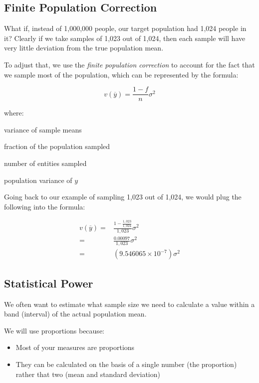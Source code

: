 \documentclass[11pt]{lecturenotes}
\begin{document}









\subsection{Finite Population Correction}
What if, instead of 1,000,000 people, our target population had 1,024 people in it? Clearly if we take samples of 1,023 out of 1,024, then each sample will have very little deviation from the true population mean. 

To adjust that, we use the \emph{finite population correction} to account for the fact that we sample most of the population, which can be represented by the formula:

\[ v(\overline{y})=\frac{1-f}{n}\sigma^2 \]

where:
\begin{description}\itemsep0pt
\item[$v(\overline{y})$] variance of sample means
\item[$f$] fraction of the population sampled
\item[$n$] number of entities sampled
\item[$\sigma^2$] population variance of $y$
\end{description}

Going back to our example of sampling 1,023 out of 1,024, we would plug the following into the formula:
\vspace{-1em}

\begin{align*}
v(\overline{y}) = & \frac{1-\frac{1,023}{1,024}}{1,023}\sigma^2 \\
= & \frac{0.00097}{1,023}\sigma^2 \\
= & (9.546065\times 10^{-7})\sigma^2
\end{align*}

\subsection{Statistical Power}
We often want to estimate what sample size we need to calculate a value within a band (interval) of the actual population mean. 

We will use proportions because: 
\begin{itemize}
\item Most of your measures are proportions
\item They can be calculated on the basis of a single number (the proportion) rather that two (mean and standard deviation)
\end{itemize}
\end{document}
